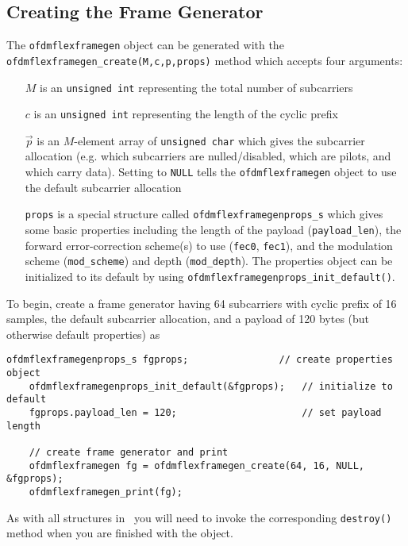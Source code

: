 \subsection{Creating the Frame Generator}
\label{tutorial:ofdmflexframe:framegen}
%
The {\tt ofdmflexframegen} object can be generated with the
{\tt ofdmflexframegen\_create(M,c,p,props)} method which accepts four arguments:
%
\begin{itemize}
\item[$M$] is an {\tt unsigned int} representing the total number of
    subcarriers
\item[$c$] is an {\tt unsigned int} representing the length of the
    cyclic prefix
\item[$\vec{p}$] is an $M$-element array of {\tt unsigned char} which
    gives the subcarrier allocation (e.g. which subcarriers
    are nulled/disabled, which are pilots, and which carry data).
    Setting to {\tt NULL} tells the {\tt ofdmflexframegen} object to use
    the default subcarrier allocation
\item[{\tt props}] is a special structure called
    {\tt ofdmflexframegenprops\_s}
    which gives some basic properties including
    the length of the payload ({\tt payload\_len}),
    the forward error-correction scheme(s) to use ({\tt fec0},
    {\tt fec1}),
    and the modulation scheme ({\tt mod\_scheme}) and depth
    ({\tt mod\_depth}).
    The properties object can be initialized to its default by using
    {\tt ofdmflexframegenprops\_init\_default()}.
\end{itemize}
%
To begin, create a frame generator having 64 subcarriers with cyclic
prefix of 16 samples, the default subcarrier allocation, and
a payload of 120 bytes (but otherwise default properties) as
%
\begin{Verbatim}[fontsize=\small]
    ofdmflexframegenprops_s fgprops;                // create properties object
    ofdmflexframegenprops_init_default(&fgprops);   // initialize to default
    fgprops.payload_len = 120;                      // set payload length

    // create frame generator and print
    ofdmflexframegen fg = ofdmflexframegen_create(64, 16, NULL, &fgprops);
    ofdmflexframegen_print(fg);
\end{Verbatim}
%
As with all structures in \liquid\ you will need to invoke the
corresponding {\tt destroy()} method when you are finished with the
object.

